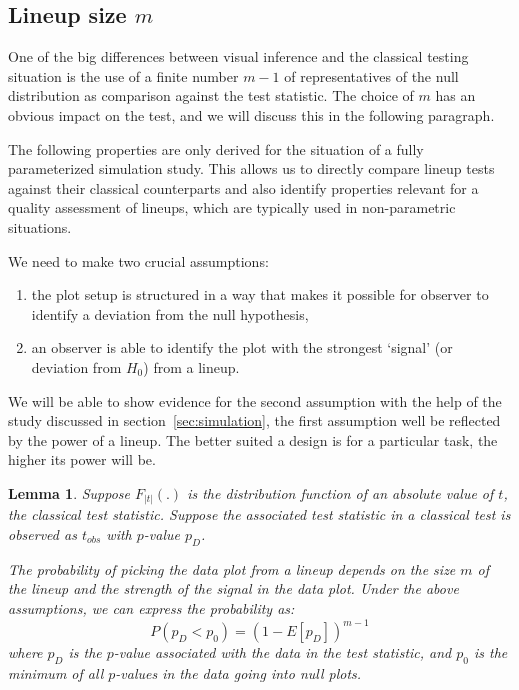 \documentclass{article}
\newcommand{\red}[1]{{\color{red} #1}} %
\newtheorem{lemma}[thm]{Lemma}
\begin{document}

\subsection*{Lineup size $m$}
\noindent
One of the big differences between visual inference and the classical testing situation is the use of a finite number $m-1$ of representatives of the null distribution as comparison against the test statistic. The choice of $m$ has an obvious impact on the test, and we will discuss this in the following paragraph.

The following properties are only derived for the situation of a  fully parameterized  simulation study. This allows us to directly compare lineup tests against their classical counterparts and also identify  properties relevant for a quality assessment of  lineups, which are typically used  in non-parametric situations.

We need to make two crucial assumptions:
\begin{enumerate}
\item  the plot setup is structured in a way that makes it possible for observer to identify a deviation from the null hypothesis,
\item an observer is able to identify the plot with the strongest `signal' (or deviation from $H_0$)  from a lineup.
\end{enumerate}
We will be able to show evidence for the second assumption with the help of the study discussed in section~\ref{sec:simulation}, the first assumption well be reflected by the power of a lineup. The better suited a design is for a particular task, the higher its power will be.

\begin{lemma}
Suppose $F_{|t|}(.)$ is the distribution function of an absolute value of $t$, the classical test statistic. Suppose the associated test statistic in a classical test is observed as  $t_{obs}$ with $p$-value $p_D$. 

The probability of picking the data plot from a lineup depends on the size $m$ of the lineup and the strength of the signal in the data plot. 
Under the above assumptions, we can express the probability as:
\[
P(p_D < p_0) = \left(1 - E[p_D] \right)^{m-1} 
\]
where $p_D$ is the $p$-value associated with the data in the test statistic, and $p_0$ is the minimum of all $p$-values in the data going into null plots.
\end{lemma}
\end{document}
